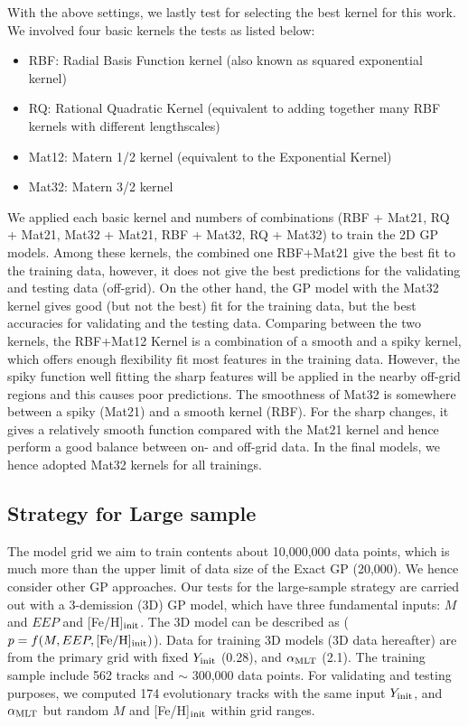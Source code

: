 With the above settings, we lastly test for selecting the best kernel for this work. We involved four basic kernels the tests as listed below:
\begin{itemize}
\item RBF: Radial Basis Function kernel (also known as squared exponential kernel)
\item RQ: Rational Quadratic Kernel (equivalent to adding together many RBF kernels with different lengthscales)
\item Mat12: Matern 1/2 kernel (equivalent to the Exponential Kernel)
\item Mat32: Matern 3/2 kernel 
\end{itemize}
We applied each basic kernel and numbers of combinations (RBF + Mat21, RQ + Mat21, Mat32 + Mat21, RBF + Mat32, RQ + Mat32) to train the 2D GP models. Among these kernels, the combined one RBF+Mat21 give the best fit to the training data, however, it does not give the best predictions for the validating and testing data (off-grid).  On the other hand, the GP model with the Mat32 kernel gives good (but not the best) fit for the training data, but the best accuracies for validating and the testing data. 
%
Comparing between the two kernels, the RBF+Mat12 Kernel is a combination of a smooth and a spiky kernel, which offers enough flexibility fit most features in the training data. However, the spiky function well fitting the sharp features will be applied in the nearby off-grid regions and this causes poor predictions. 
%
The smoothness of Mat32 is somewhere between a spiky (Mat21) and a smooth kernel (RBF). For the sharp changes, it gives a relatively smooth function compared with the Mat21 kernel and hence perform a good balance between on- and off-grid data. 
%
In the final models, we hence adopted Mat32 kernels for all trainings.  

 \subsection{Strategy for Large sample}

The model grid we aim to train contents about 10,000,000 data points, which is much more than the upper limit of data size of the Exact GP (20,000). We hence consider other GP approaches. Our tests for the large-sample strategy are carried out with a 3-demission (3D) GP model, which have three fundamental inputs: $M$ and $EEP$ and  [Fe/H]$_{\rm init}$. The 3D model can be described as  ($p = f(M, EEP, {\rm [Fe/H]_{init}})$). 
Data for training 3D models (3D data hereafter) are from the primary grid with fixed $Y_{\rm init}$ (0.28), and $\alpha_{\rm MLT}$ (2.1). The training sample include 562 tracks and $\sim$ 300,000 data points. 
%
For validating and testing purposes, we computed 174 evolutionary tracks with the same input $Y_{\rm init}$, and $\alpha_{\rm MLT}$ but random $M$ and [Fe/H]$_{\rm init}$ within grid ranges. 


